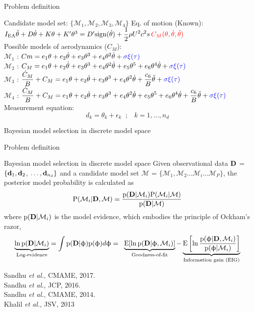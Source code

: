 \documentclass[xcolor=dvipsnames,10pt]{beamer}
\newcommand{\df}{\displaystyle\frac}
\newcommand{\epar}[1]{\mbox{$e_{#1}$}}
\def\Ex{\mbox{\text{E}}}
\newcommand{\M}{\mathcal{M}}
\def\bbM{\mbox{$\M$}}
\def\th{\ensuremath{\theta}}
\def\dth{\ensuremath{\dot{\theta}}}
\def\ddth{\ensuremath{\ddot{\theta}}}
\def\prob{\mbox{$\text{p}$}}
\def\Prob{\mbox{$\text{P}$}}
\def\bd{\mbox{\bf d}}
\def\bdn{\mbox{$\bD$}}
\def\nd{\ensuremath{n_{d}}}
\def\bD{\mbox{\bf D}}
\def\bphi{\mbox{\ensuremath{\upphi}}}
\newcommand{\beq}{\begin{equation}}
\newcommand{\eeq}{\end{equation}}
\def\Ex{\mbox{$\text{E}$}}
\def\Cm{\ensuremath{\text{C}_{m}(\th)}}
\def\IEA{\ensuremath{I_{\text{EA}}}}
\def\dCm{\mbox{$\dot{C}_{M}$}}
\def\Cm{\ensuremath{C_{M}}}
\newcommand{\alertb}[1]{\begin{center}\alert{#1}\end{center}}
\newcommand{\red}[1]{{\textcolor{red}{#1}}}
\newcommand{\blue}[1]{{\textcolor{blue}{#1}}}
\newcommand{\newblockb}[2]{\begin{block}{#1} \small #2 \end{block}}
\begin{document}
\begin{frame}{Problem definition}
\newblockb{Candidate model set: $\{\M_1, \M_2, \M_3, \M_4 \}$}{
Eq. of motion (Known): \\
$
\IEA \ddth + D \dth + K \th + K' \th^3  = D' \text{sign}(\dth) + \df{1}{2}\rho U^2c^2s\, \red{\Cm(\th,\dth,\ddth)}$ \\[0.1in]
Possible models of aerodynamics ($\Cm$): \\[0.1in]
$\M_1$ : $Cm = \epar{1} \th + \epar{2} \dth + \epar{3} \th^3 + \epar{4} \th^2 \dth + \blue{\sigma \xi(\tau)}$ \\[0.1in]
$\M_2$ : $\Cm = \epar{1} \th + \epar{2} \dth + \epar{3} \th^3 + \epar{4} \th^2 \dth +  \epar{5} \th^5 +  \epar{6} \th^4 \dth  + \blue{\sigma \xi(\tau)}$ \\[0.1in]
$\M_3$ : $ \df{\dCm}{B} + \Cm = \epar{1} \th + \epar{2} \dth + \epar{3} \th^3 + \epar{4} \th^2 \dth   + \df{c_6}{B} \ddth  + \blue{\sigma \xi(\tau) }$\\[0.1in]
$\M_4$ : $ \df{\dCm}{B} + \Cm = \epar{1} \th + \epar{2} \dth + \epar{3} \th^3 + \epar{4} \th^2 \dth +  \epar{5} \th^5 +  \epar{6} \th^4 \dth  + \df{c_6}{B} \ddth  + \blue{\sigma \xi(\tau)} $ \\[0.1in]

Measurement equation:
\beq
d_k = \th_k + \epsilon_k \;\; ; \;\;\; k = 1, \ldots, \nd
\eeq
}
\alertb{Bayesian model selection in discrete model space}
\end{frame}


\begin{frame}{Problem definition}
\newblockb{Bayesian model selection in discrete model space}{ Given observational data $\bdn$ = $\{\bd_1,\bd_2$, $\ldots, \bd_{\nd}\}$ and a candidate model set $\bbM$ = $ \{\M_1,\M_2\ldots\M_i\ldots\M_P\}$, the posterior model probability is calculated as 
\beq
\Prob(\M_i |\bdn,\bbM) = \df{\prob(\bdn |\M_i) \Prob(\M_i |\bbM)}{\prob(\bdn |\bbM)}
\eeq 
where $\prob(\bdn |\M_i)$ is the model evidence, which embodies the principle of Ockham's razor,
\beq
\underbrace{\ln \prob(\bdn|\M_i)}_\text{Log-evidence} =  \int \prob(\bdn|\bphi) \prob(\bphi) d \bphi = \;\;\underbrace{\Ex[\ln \prob(\bdn|\bphi,\M_i)]}_\text{Goodness-of-fit} - \underbrace{\Ex\left[\ln\df{\prob(\bphi|\bdn,\M_i)}{\prob(\bphi|\M_i)}\right]}_\text{Information gain (EIG)}
\eeq}
\textcolor{shadecolor}{ 
Sandhu \textit{et al.}, CMAME, 2017. \\
Sandhu \textit{et al.}, JCP, 2016. \\
Sandhu \textit{et al.}, CMAME, 2014.\\
Khalil \textit{et al.}, JSV, 2013}
\end{frame}
\end{document}
